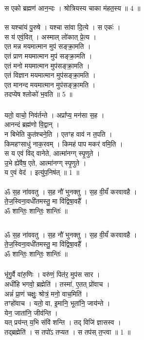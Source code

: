 स एको ब्रह्मण॑ आन॒न्दः । श्रोत्रियस्य चाका म॑हत॒स्य ॥ 4 ॥\\
\\
स यश्चा॑यं पु॒रुषे । यश्चा सा॑वा दि॒त्ये । स एकः॑ ।\\
स य॑ एवं॒वित् । अस्माल् लो॑कात् प्रे॒त्य ।\\
एत मन्न मयमात्मान मुप॑ सङ्क्रा॒मति ।\\
एतं प्राण मयमात्मान मुप॑ सङ्क्रा॒मति ।\\
एतं मनो मयमात्मान मुप॑सङ्क्रा॒मति ।\\
एतं विज्ञान मयमात्मान मुप॑सङ्क्रा॒मति ।\\
एत मानन्द मयमात्मान मुप॑सङ्क्रा॒मति ।\\
तदप्येष श्लोको॑ भ॒वति ॥ 5 ॥\\
\subsubsection{}
यतो॒ वाचो॒ निव॑र्तन्ते । अप्रा᳚प्य॒ मन॑सा स॒ह ।\\
आनन्दं ब्रह्म॑णो वि॒द्वान् ।\\
न बिभेति कुत॑श्चने॒ति । एतꣳह वाव॑ न त॒पति ।\\
किमहꣳसाधु॑ नाक॒रवम् । किमहं पाप मकर॑ वमि॒ति ।\\
स य एवं विद् वानेते, आत्मा॑नग्ग् स्पृ॒णुते ।\\
उ॒भे ह्ये॑वैष॒ एते, आत्मा॑नग्ग् स्पृ॒णुते । \\
य ए॒वं वेद॑ । इत्यु॑प॒निष॑त् ॥ 1 ॥\\
\\
ॐ स॒ह ना॑ववतु । स॒ह नौ॑ भुनक्तु । स॒ह वी॒र्यं॑ करवावहै ।\\
ते॒ज॒स्विना॒वधी॑तमस्तु॒ मा वि॑द्विषा॒वहै᳚ ।\\
ॐ शान्तिः॒ शान्तिः॒ शान्तिः॑ ॥\\
\subsection{}
ॐ स॒ह ना॑ववतु । स॒ह नौ॑ भुनक्तु । स॒ह वी॒र्यं॑ करवावहै ।\\
ते॒ज॒स्विना॒वधी॑तमस्तु॒ मा वि॑द्विषा॒वहै᳚ ।\\
ॐ शान्तिः॒ शान्तिः॒ शान्तिः॑ ॥\\
\subsubsection{}
भृ॑गु॒र्वै वा॑रु॒णिः । वरु॑णं॒ पित॑र॒ मुप॑स सार ।\\
अधी॑हि भगवो॒ ब्रह्मेति॑ । तस्मा॑, ए॒तत् प्रो॑वाच ।\\
अन्नं॑ प्रा॒णं चक्षुः॒ श्रोत्रं॒ मनो॒ वाच॒मिति॑ ।\\
तꣳहो॑वाच । यतो॒ वा, इ॒मानि॒ भूता॑नि॒ जाय॑न्ते ।\\
येन॒ जाता॑नि॒ जीव॑न्ति ।\\
यत् प्रय॑न्त् य॒भि संवि॑ शन्ति । तद् विजि॑ ज्ञासस्व । \\
तद्ब्रह्मेति॑ । स तपो॑ऽ तप्यत । स तप॑स् त॒प्त्वा ॥ 1 ॥\\
